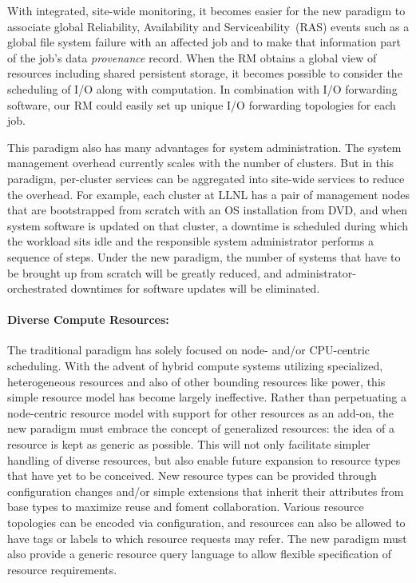 \documentclass{article}
\begin{document}
With integrated, site-wide monitoring, it becomes easier
for the new paradigm to associate global Reliability, Availability and Serviceability~(RAS) 
events such as a global file system
failure with an affected job and to make that information part of
the job's data {\em provenance} record. When the RM obtains a global view of
resources including shared persistent storage, it becomes possible to
consider the scheduling of I/O along with computation. In combination with
I/O forwarding software, our RM could easily set up unique I/O forwarding
topologies for each job.

This paradigm also has many advantages for system administration.
The system management overhead currently scales with the number of clusters.
But in this paradigm, per-cluster services can be aggregated into
site-wide services to reduce the overhead.
For example, each cluster at LLNL has a pair of management
nodes that are bootstrapped from scratch with an OS installation from DVD,
and when system software is updated on that cluster, a downtime is
scheduled during which the workload sits idle and the responsible system
administrator performs a sequence of steps. Under the new paradigm, the
number of systems that have to be brought up from scratch will be
greatly reduced, and administrator-orchestrated downtimes for software
updates will be eliminated. 


\paragraph{Diverse Compute Resources:}
The traditional paradigm has solely focused on node- and/or CPU-centric
scheduling. With the advent of hybrid compute systems utilizing specialized,
heterogeneous resources and also of other bounding resources like power, 
this simple resource model has become largely ineffective. 
Rather than
perpetuating a node-centric resource model with support for other
resources as an add-on, the new paradigm must embrace the concept of generalized resources: 
the idea of a resource is kept as generic as possible. This will not only facilitate 
simpler handling of diverse resources, but also enable future expansion to resource types that have yet to
be conceived. New resource types can be provided through configuration changes
and/or simple extensions that inherit their attributes from base types 
to maximize reuse and foment collaboration. Various resource topologies
can be encoded via configuration, and resources can also be allowed to have tags or labels
to which resource requests may refer. 
The new paradigm must also provide a generic resource query language to allow flexible
specification of resource requirements.
\end{document}
